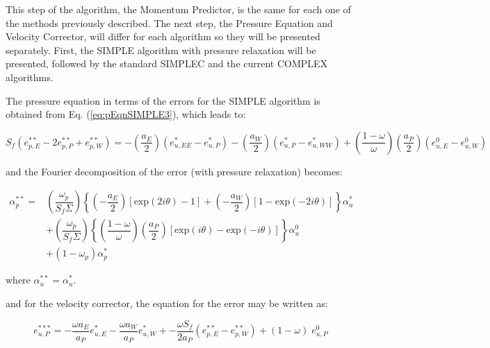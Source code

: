 \documentclass[final,3p,times,10pt,onecolumn]{myElsarticle}
\numberwithin{equation}{section}
\begin{document}
This step of the algorithm, the Momentum Predictor, is the same for each one of the methods previously described. The next step, the Pressure Equation and Velocity Corrector, will differ for each algorithm so they will be presented separately. First, the SIMPLE algorithm with pressure relaxation will be presented, followed by the standard SIMPLEC and the current COMPLEX algorithms.

The pressure equation in terms of the errors for the SIMPLE algorithm is obtained from Eq. (\ref{eq:pEqnSIMPLE3}), which leads to:

\begin{equation}
    S_f (e_{p,E}^{**} - 2 e_{p,P}^{**} + e_{p,W}^{**}) = 
     -\left(\dfrac{a_E}{2}\right) (e_{u,EE}^* - e_{u,P}^*) 
    -\left(\dfrac{a_W}{2}\right) (e_{u,P}^* - e_{u,WW}^*)  +
    \left( \dfrac{1-\omega}{\omega} \right) \left(\dfrac{a_P}{2}\right) (e_{u,E}^0 - e_{u,W}^0)
\end{equation}

\noindent and the Fourier decomposition of the error (with pressure relaxation) becomes:

\begin{equation}
\begin{split}
    \alpha_p^{**} = &\left( \dfrac{\omega_p}{S_f \Sigma} \right) 
                    \left\{ \left(-\dfrac{a_E}{2} \right) \left[\text{exp} (2 i \theta) - 1 \right] +
                            \left(-\dfrac{a_W}{2} \right) \left[1 - \text{exp} (-2 i \theta)\right]
                    \right\} \alpha_u^{*} \\
                    & + \left( \dfrac{\omega_p}{S_f \Sigma} \right) 
                    \left\{ \left(\dfrac{1-\omega}{\omega} \right) \left(\dfrac{a_P}{2} \right) \left[\text{exp} (i \theta) - \text{exp} (- i \theta) \right] 
                    \right\} \alpha_u^{0} \\
                    & + (1-\omega_p) \alpha_p^*    
\end{split}
\end{equation}

\noindent where $\alpha_u^{**} = \alpha_u^{*}$.

\noindent and for the velocity corrector, the equation for the error may be written as:

\begin{equation}
    e_{u,P}^{***} = -\dfrac{\omega a_E}{a_P} e_{u,E}^{*} -\dfrac{\omega a_W}{a_P} e_{u,W}^{*} +
                   -\dfrac{\omega S_f}{2 a_P} (e_{p,E}^{**}-e_{p,W}^{**}) +
                   (1-\omega) \; e_{u,P}^0
\end{equation}
\end{document}
